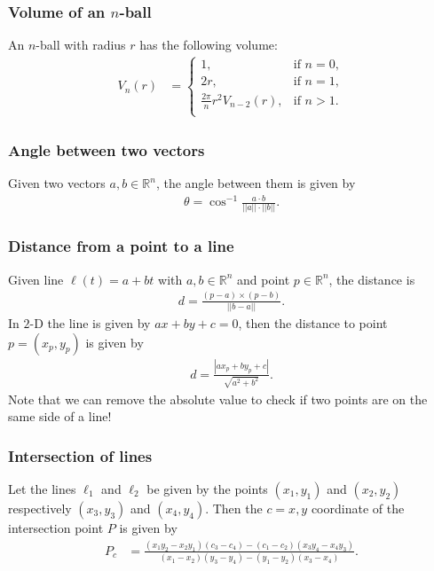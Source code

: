 \subsubsection{Volume of an $n$-ball}
An $n$-ball with radius $r$ has the following volume:
\begin{align*}
    V_n(r) &= \left\{\begin{array}{ll}
        1, & \text{if }n = 0, \\
        2r, & \text{if }n = 1, \\
        \frac{2\pi}n r^2 V_{n-2}(r), & \text{if }n > 1. \\
    \end{array}\right.
\end{align*}

\subsubsection{Angle between two vectors}
Given two vectors $a, b \in \mathbb R^n$, the angle between them is given by
\begin{align*}
    \theta = \cos^{-1}\frac{a\cdot b}{||a||\cdot||b||}.
\end{align*}

\subsubsection{Distance from a point to a line}
Given line $\ell(t) = a + bt$ with $a, b \in \mathbb R^n$ and point $p \in \mathbb R^n$, the distance is
\begin{align*}
    d = \frac{(p - a) \times (p - b)}{||b - a||}.
\end{align*}
In $2$-D the line is given by $ax + by + c = 0$, then the distance to point $p = (x_p, y_p)$ is given by
\begin{align*}
    d = \frac{|ax_p + by_p + c|}{\sqrt{a^2 + b^2}}.
\end{align*}
Note that we can remove the absolute value to check if two points are on the same side of a line!

\subsubsection{Intersection of lines}
Let the lines $\ell_1$ and $\ell_2$ be given by the points $(x_1, y_1)$ and $(x_2, y_2)$ respectively $(x_3, y_3)$ and $(x_4, y_4)$. Then the $c = x, y$ coordinate of the intersection point $P$ is given by
\begin{align*}
    P_c &= \frac{(x_1y_2 - x_2y_1)(c_3 - c_4) - (c_1 - c_2)(x_3y_4 - x_4y_3)}{(x_1 - x_2)(y_3 - y_4) - (y_1 - y_2)(x_3 - x_4)}.
\end{align*}

